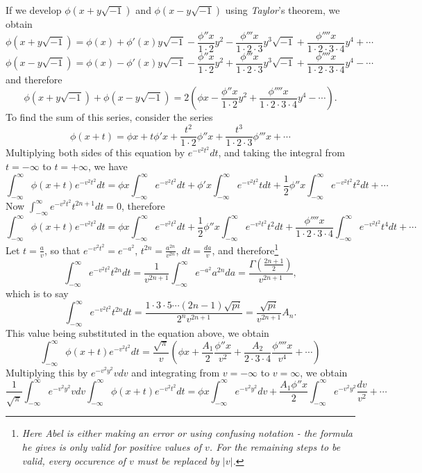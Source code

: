 \documentclass[12pt]{article}
\begin{document}
If we develop $\phi(x+y\sqrt{-1})$ and $\phi(x-y\sqrt{-1})$ using \emph{Taylor}'s theorem, we obtain
\[ \phi(x+y\sqrt{-1}) = \phi(x) + \phi'(x)y\sqrt{-1} - \frac{\phi''x}{1\cdot 2}y^2 - \frac{\phi'''x}{1\cdot2\cdot3} y^3\sqrt{-1} + \frac{\phi'''' x}{1\cdot2\cdot3\cdot4} y^4 + \cdots \]
\[ \phi(x-y\sqrt{-1}) = \phi(x) - \phi'(x)y\sqrt{-1} - \frac{\phi''x}{1\cdot 2} y^2 + \frac{\phi'''x}{1\cdot2\cdot3} y^3\sqrt{-1} + \frac{\phi'''' x}{1\cdot2\cdot3\cdot4} y^4 - \cdots \]
and therefore 
\[ \phi(x+y\sqrt{-1}) + \phi( x- y \sqrt{-1}) = 2(\phi x - \frac{\phi''x}{1\cdot2}y^2 + \frac{\phi''''x}{1\cdot 2 \cdot 3 \cdot 4} y^4 - \cdots) . \]
To find the sum of this series, consider the series
\[ \phi(x+t) = \phi x + t \phi' x + \frac{t^2}{1 \cdot 2} \phi'' x + \frac{t^3}{1 \cdot 2 \cdot 3} \phi'''x+\cdots \]
Multiplying both sides of this equation by $e^{-v^2t^2}dt$, and taking the integral from $t= -\infty$ to $t=+\infty$, we have 
\[ \int_{-\infty}^{\infty} \phi(x+t) e^{-v^2t^2} dt = \phi x \int_{-\infty}^{\infty} e^{-v^2t^2} dt + \phi' x \int_{-\infty}^{\infty} e^{-v^2t^2} tdt + \frac{1}{2} \phi'' x \int_{-\infty}^{\infty} e^{-v^2t^2}t^2dt + \cdots \]
Now $\int_{-\infty}^{\infty} e^{-v^2t^2} t^{2n+1} dt = 0$, therefore 
\[ \int_{-\infty}^{\infty} \phi(x+t) e^{-v^2t^2} dt = \phi x \int_{-\infty}^{\infty} e^{-v^2t^2} dt + \frac{1}{2} \phi'' x \int_{-\infty}^{\infty} e^{-v^2t^2}t^2dt + \frac{\phi'''' x}{1\cdot 2 \cdot 3 \cdot 4} \int_{-\infty}^{\infty} e^{-v^2t^2} t^4dt + \cdots \]
Let $t = \frac{a}{v}$, so that $e^{-v^2t^2} = e^{-a^2}$, $t^{2n} = \frac{a^{2n}}{v^{2n}}$, $dt = \frac{da}{v}$, and therefore\footnote{\emph{Here Abel is either making an error or using confusing notation - the formula he gives is only valid for positive values of $v$.  For the remaining steps to be valid, every occurence of $v$ must be replaced by $|v|$.}}
\[ \int_{-\infty}^{\infty} e^{-v^2t^2} t^{2n} dt = \frac{1}{v^{2n+1}} \int_{-\infty}^{\infty} e^{-a^2} a^{2n} da = \frac{\Gamma(\frac{2n+1}{2})}{v^{2n+1}}, \]
which is to say
\[ \int_{-\infty}^{\infty} e^{-v^2t^2} t^{2n} dt = \frac{1\cdot 3 \cdot 5 \cdots (2n-1) \sqrt{pi}}{2^n v^{2n+1}} = \frac{\sqrt{pi}}{v^{2n+1}} A_n. \]
This value being substituted in the equation above, we obtain
\[ \int_{-\infty}^{\infty} \phi(x+t) e^{-v^2t^2} dt = \frac{\sqrt{\pi}}{v} ( \phi x + \frac{A_1}{2} \frac{\phi''x}{v^2} + \frac{A_2}{2 \cdot 3 \cdot 4} \frac{\phi'''' x}{v^4} + \cdots ) \]
Multiplying this by $e^{-v^2y^2}vdv$ and integrating from $v = -\infty$ to $v=\infty$, we obtain
\[ \frac{1}{\sqrt{\pi}} \int_{-\infty}^{\infty} e^{-v^2y^2}vdv \int_{-\infty}^{\infty} \phi(x+t)e^{-v^2t^2}dt = \phi x \int_{-\infty}^{\infty} e^{-v^2y^2} dv+ \frac{A_1 \phi'' x}{2} \int_{-\infty}^{\infty} e^{-v^2y^2}\frac{dv}{v^2} + \cdots \]
\end{document}
